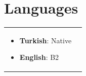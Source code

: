 \documentclass[letterpaper,11pt]{article}
\begin{document}
\section{Languages}
\begin{tabularx}{\textwidth\vspace{-20pt}}{X X}
    \begin{itemize}[leftmargin=0.15in, label={} ]
        \small\item \textbf{Turkish}{: Native} 
        \vspace{-8pt}\item \textbf{English}{: B2}
    \end{itemize} 
\end{tabularx}
\end{document}

